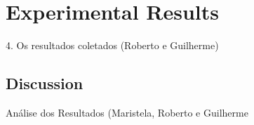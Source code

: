 \section{Experimental Results}\label{sec:results}%

4. Os resultados coletados (Roberto e Guilherme)

\subsection{Discussion}\label{subsec:discussion}%
Análise dos Resultados (Maristela, Roberto e Guilherme